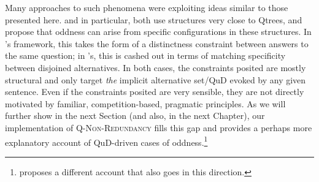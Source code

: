\begin{exe}
	\begin{xlist}
	\end{xlist}
\end{exe}

Many approaches to such phenomena were exploiting ideas similar to those presented here. \citet{Ippolito2019} and \citet{Zhang2022} in particular, both use structures very close to Qtrees, and propose that oddness can arise from specific configurations in these structures. In \citeauthor{Zhang2022}'s framework, this takes the form of a distinctness constraint between answers to the same question; in \citeauthor{Ippolito2019}'s, this is cashed out in terms of matching specificity between disjoined alternatives. In both cases, the constraints posited are mostly structural and only target \textit{the} implicit alternative set/QuD evoked by any given sentence. Even if the constraints posited are very sensible, they are not directly motivated by familiar, competition-based, pragmatic principles. As we will further show in the next Section (and also, in the next Chapter), our implementation of \textsc{Q-Non-Redundancy} fills this gap and provides a perhaps more explanatory account of QuD-driven cases of oddness.\footnote{ proposes a different account that also goes in this direction.}

